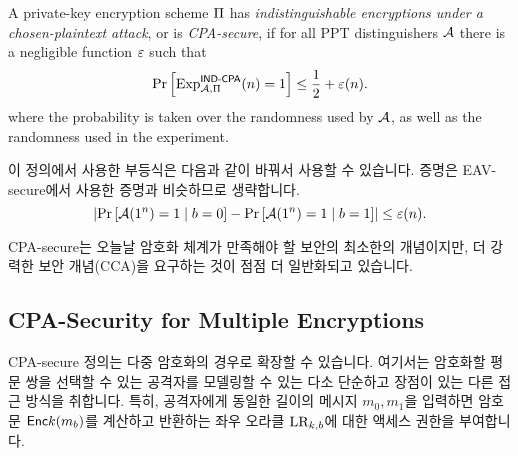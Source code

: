 \begin{definition} \label{def:cpa}
  A private-key encryption scheme $\Pi$ has \emph{indistinguishable encryptions under a chosen-plaintext attack}, or is \emph{CPA-secure}, if for all PPT distinguishers $\mathcal{A}$ there is a negligible function $\varepsilon$ such that
  \begin{equation}
    \text{Pr} \left[ \text{Exp}_{\mathcal{A}, \Pi}^{\textsf{IND-CPA}}(n) = 1 \right] \le \frac{1}{2} + \varepsilon(n).
  \end{equation}
  where the probability is taken over the randomness used by $\mathcal{A}$, as well as the randomness used in the experiment.
\end{definition}

이 정의에서 사용한 부등식은 다음과 같이 바꿔서 사용할 수 있습니다. 증명은 EAV-secure에서 사용한 증명과 비슷하므로 생략합니다.
\begin{equation}
  \left| 
    \text{Pr} \left[ \mathcal{A}(1^n) = 1 \;|\; b = 0 \right] - \text{Pr} \left[ \mathcal{A}(1^n) = 1 \;|\; b = 1 \right]
   \right| \le \varepsilon(n).
\end{equation}

CPA-secure는 오늘날 암호화 체계가 만족해야 할 보안의 최소한의 개념이지만, 더 강력한 보안 개념(CCA)을 요구하는 것이 점점 더 일반화되고 있습니다.

\newpage
\subsection*{CPA-Security for Multiple Encryptions}
CPA-secure 정의는 다중 암호화의 경우로 확장할 수 있습니다. 여기서는 암호화할 평문 쌍을 선택할 수 있는 공격자를 모델링할 수 있는 다소 단순하고 장점이 있는 다른 접근 방식을 취합니다. 특히, 공격자에게 동일한 길이의 메시지 $m_0, m_1$을 입력하면 암호문 $\textsf{Enc}{k}(m_b)$를 계산하고 반환하는 좌우 오라클 $\text{LR}_{k, b}$에 대한 액세스 권한을 부여합니다.

